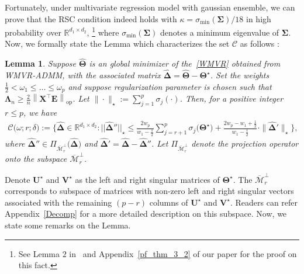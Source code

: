\documentclass[12pt]{article}
\newtheorem{lemma}[theorem]{Lemma}
\begin{document}
Fortunately, under multivariate regression model with gaussian ensemble, we can prove that the RSC condition indeed holds with $\kappa=\sigma_{\text{min}}(\boldsymbol{\Sigma})/18$ in high probability over $\mathbb{R}^{d_{1} \times d_{2}}$,
\footnote{See Lemma $2$ in~\citet{negahban2011estimation} and Appendix~\ref{pf_thm_3_2} of our paper for the proof on this fact.} where $\sigma_{\text{min}}(\boldsymbol{\Sigma})$ denotes a minimum eigenvalue of $\boldsymbol{\Sigma}$.
Now, we formally state the Lemma which characterizes the set $\mathcal{C}$ as follows : 

\begin{lemma} \label{Cone_like_set}
Suppose $\widehat{\boldsymbol{\Theta}}$ is an global minimizer of the~\eqref{WMVR} obtained from WMVR-ADMM, with the associated matrix $\boldsymbol{\widehat{\Delta}} = \widehat{\boldsymbol{\Theta}}-\boldsymbol{\Theta^{\star}}$.
Set the weights $\frac{1}{2} < \omega_{1} \leq \dots \leq \omega_{p}$ and 
suppose regularization parameter is chosen such that $\boldsymbol{\Lambda}_{n}\geq\frac{2}{n}\left\| \boldsymbol{X}^{\top}\boldsymbol{E} \right\|_{\text{op}}$.
Let $\|\cdot\|_{\star}:=\sum_{j=1}^{p}\sigma_{j}(\cdot)$.
Then, for a positive integer $r\leq p$, we have
\begin{align} \label{cone_set}
    \mathcal{C}\big( \omega;r;\delta \big) 
    := \bigg\{ \boldsymbol{\widehat{\Delta}}\in\mathbb{R}^{d_{1}\times d_{2}} :
    ||\boldsymbol{\widehat{\Delta}}''||_{\star} \leq \frac{2w_{p}}{w_{1}-\frac{1}{2}} \sum_{j=r+1}^{p}\sigma_{j}\big(\boldsymbol{\Theta^{\star}}\big) 
    + \frac{2w_{p}-w_{1}+\frac{1}{2}}{w_{1}-\frac{1}{2}}\cdot \| \boldsymbol{\widehat{\Delta}}' \|_{\star} \bigg\}, 
\end{align}
where $\boldsymbol{\widehat{\Delta}}'' \in \Pi_{\overline{\mathcal{M}}_{r}^{\perp}}\big(\boldsymbol{\widehat{\Delta}}\big)$ and $\boldsymbol{\widehat{\Delta}}'=\boldsymbol{\widehat{\Delta}}-\boldsymbol{\widehat{\Delta}}''$.
Let $\Pi_{\overline{\mathcal{M}}_{r}^{\perp}}$ denote the projection operator onto the subspace $\overline{\mathcal{M}}_{r}^{\perp}$.
\end{lemma}

Denote $\boldsymbol{U}^{\star}$ and $\boldsymbol{V}^{\star}$ as the left and right singular matrices of $\boldsymbol{\Theta}^{\star}$.
The $\overline{\mathcal{M}}_{r}^{\perp}$ corresponds to subspace of matrices with non-zero left and right singular vectors associated with the remaining $(p-r)$ columns of $\boldsymbol{U}^{\star}$ and $\boldsymbol{V}^{\star}$. Readers can refer Appendix~\ref{Decomp} for a more detailed description on this subspace. Now, we state some remarks on the Lemma.
\end{document}
